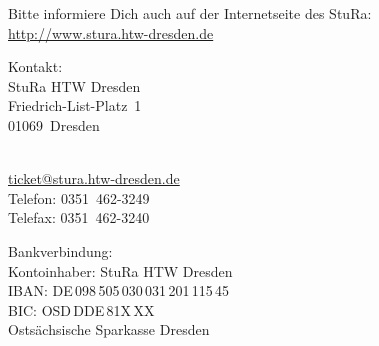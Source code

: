 \documentclass[%
	ngerman,	%
	parskip=half,
	paper=a4,%
	pagesize=auto	%
	]{scrartcl}
\begin{document}
Bitte informiere Dich auch auf der Internetseite des StuRa:
\url{http://www.stura.htw-dresden.de}

\noindent
\parbox{.3\linewidth}{
Kontakt:\\
StuRa HTW Dresden\\
Friedrich-List-Platz~1\\
01069~Dresden\\
\hspace{0em}
}
\hfill
\parbox{.3\linewidth}{
\hspace{0em}\\
\href{mailto:ticket@stura.htw-dresden.de}{ticket@stura.htw-dresden.de}\\
Telefon: 0351~462-3249\\
Telefax: 0351~462-3240\\
\hspace{0em}
}
\hfill
\parbox{.3\linewidth}{
Bankverbindung:\\
Kontoinhaber: StuRa HTW Dresden\\
IBAN: DE\,098\,505\,030\,031\,201\,115\,45\\
BIC: OSD\,DDE\,81X\,XX\\
Ostsächsische Sparkasse Dresden
}
\end{document}

